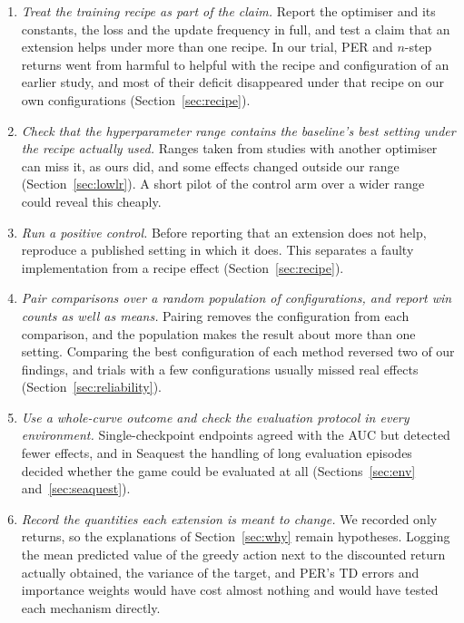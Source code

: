 \documentclass[conference,a4paper]{IEEEtran}
\begin{document}
\begin{enumerate}
\item \emph{Treat the training recipe as part of the claim.} Report the optimiser and its constants, the loss and the
update frequency in full, and test a claim that an extension helps under more than one recipe. In our trial, PER and
$n$-step returns went from harmful to helpful with the recipe and configuration of an earlier study, and most of their
deficit disappeared under that recipe on our own configurations (Section~\ref{sec:recipe}).
\item \emph{Check that the hyperparameter range contains the baseline's best setting under the recipe actually used.}
Ranges taken from studies with another optimiser can miss it, as ours did, and some effects changed outside our range
(Section~\ref{sec:lowlr}). A short pilot of the control arm over a wider range could reveal this cheaply.
\item \emph{Run a positive control.} Before reporting that an extension does not help, reproduce a published setting
in which it does. This separates a faulty implementation from a recipe effect (Section~\ref{sec:recipe}).
\item \emph{Pair comparisons over a random population of configurations, and report win counts as well as means.}
Pairing removes the configuration from each comparison, and the population makes the result about more than one
setting. Comparing the best configuration of each method reversed two of our findings, and trials with a few
configurations usually missed real effects (Section~\ref{sec:reliability}).
\item \emph{Use a whole-curve outcome and check the evaluation protocol in every environment.} Single-checkpoint
endpoints agreed with the AUC but detected fewer effects, and in Seaquest the handling of long evaluation episodes
decided whether the game could be evaluated at all (Sections~\ref{sec:env} and~\ref{sec:seaquest}).
\item \emph{Record the quantities each extension is meant to change.} We recorded only returns, so the explanations
of Section~\ref{sec:why} remain hypotheses. Logging the mean predicted value of the greedy action next to the
discounted return actually obtained, the variance of the target, and PER's TD errors and importance weights would have
cost almost nothing and would have tested each mechanism directly.
\end{enumerate}

\end{document}
